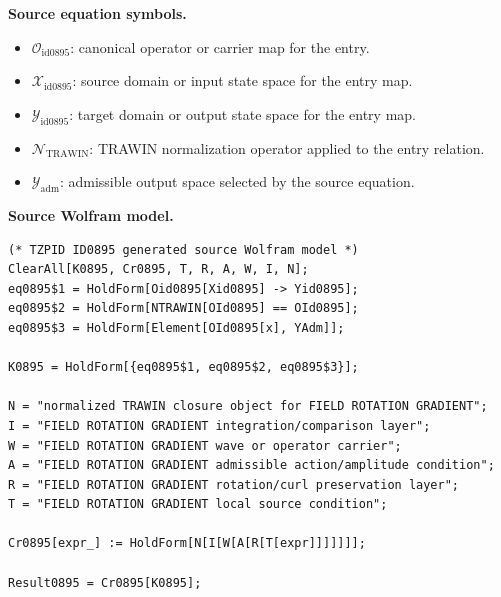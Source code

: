 \begin{minipage}[t]{0.49\linewidth}
\begingroup
\small
\raggedright
\textbf{Source equation symbols.}\par
\begin{itemize}[leftmargin=1.35em,itemsep=1pt,topsep=1pt,parsep=0pt]
    \item $\mathcal{O}_{\mathrm{id0895}}$: canonical operator or carrier map for the entry.
    \item $\mathcal{X}_{\mathrm{id0895}}$: source domain or input state space for the entry map.
    \item $\mathcal{Y}_{\mathrm{id0895}}$: target domain or output state space for the entry map.
    \item $\mathcal{N}_{\mathrm{TRAWIN}}$: TRAWIN normalization operator applied to the entry relation.
    \item $\mathcal{Y}_{\mathrm{adm}}$: admissible output space selected by the source equation.
\end{itemize}
\endgroup
\end{minipage}\hfill
\begin{minipage}[t]{0.47\linewidth}
\begingroup
\scriptsize
\raggedright
\textbf{Source Wolfram model.}\par
\begin{Verbatim}[fontsize=\tiny,breaklines=true,breakanywhere=true]
(* TZPID ID0895 generated source Wolfram model *)
ClearAll[K0895, Cr0895, T, R, A, W, I, N];
eq0895$1 = HoldForm[Oid0895[Xid0895] -> Yid0895];
eq0895$2 = HoldForm[NTRAWIN[OId0895] == OId0895];
eq0895$3 = HoldForm[Element[OId0895[x], YAdm]];

K0895 = HoldForm[{eq0895$1, eq0895$2, eq0895$3}];

N = "normalized TRAWIN closure object for FIELD ROTATION GRADIENT";
I = "FIELD ROTATION GRADIENT integration/comparison layer";
W = "FIELD ROTATION GRADIENT wave or operator carrier";
A = "FIELD ROTATION GRADIENT admissible action/amplitude condition";
R = "FIELD ROTATION GRADIENT rotation/curl preservation layer";
T = "FIELD ROTATION GRADIENT local source condition";

Cr0895[expr_] := HoldForm[N[I[W[A[R[T[expr]]]]]]];

Result0895 = Cr0895[K0895];
\end{Verbatim}
\endgroup
\end{minipage}

